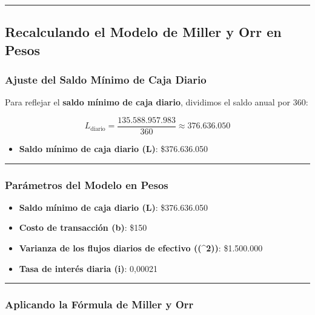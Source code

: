 \documentclass[
  letterpaper,
  DIV=11,
  numbers=noendperiod]{scrartcl}
\providecommand{\tightlist}{%
  \setlength{\itemsep}{0pt}\setlength{\parskip}{0pt}}\usepackage{longtable,booktabs,array}
\begin{document}
\begin{center}\rule{0.5\linewidth}{0.5pt}\end{center}

\subsection{Recalculando el Modelo de Miller y Orr en
Pesos}\label{recalculando-el-modelo-de-miller-y-orr-en-pesos}

\subsubsection{Ajuste del Saldo Mínimo de Caja
Diario}\label{ajuste-del-saldo-muxednimo-de-caja-diario}

Para reflejar el \textbf{saldo mínimo de caja diario}, dividimos el
saldo anual por 360:

\[
L_{\text{diario}} = \frac{135.588.957.983}{360} \approx 376.636.050
\]

\begin{itemize}
\tightlist
\item
  \textbf{Saldo mínimo de caja diario (L)}: \$376.636.050
\end{itemize}

\begin{center}\rule{0.5\linewidth}{0.5pt}\end{center}

\subsubsection{Parámetros del Modelo en
Pesos}\label{paruxe1metros-del-modelo-en-pesos}

\begin{itemize}
\tightlist
\item
  \textbf{Saldo mínimo de caja diario (L)}: \$376.636.050
\item
  \textbf{Costo de transacción (b)}: \$150
\item
  \textbf{Varianza de los flujos diarios de efectivo ((\sigma\^{}2))}:
  \$1.500.000
\item
  \textbf{Tasa de interés diaria (i)}: 0,00021
\end{itemize}

\begin{center}\rule{0.5\linewidth}{0.5pt}\end{center}

\subsubsection{Aplicando la Fórmula de Miller y
Orr}\label{aplicando-la-fuxf3rmula-de-miller-y-orr}
\end{document}
